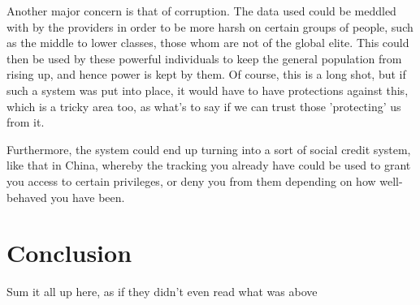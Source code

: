 \documentclass[12pt]{amsart}
\begin{document}
    Another major concern is that of corruption.
    The data used could be meddled with by the providers in order to be more harsh on certain groups of people, such as
    the middle to lower classes, those whom are not of the global elite.
    This could then be used by these powerful individuals to keep the general population from rising up, and hence power
    is kept by them.
    Of course, this is a long shot, but if such a system was put into place, it would have to have protections against
    this, which is a tricky area too, as what's to say if we can trust those 'protecting' us from it.

    Furthermore, the system could end up turning into a sort of social credit system, like that in China, whereby
    the tracking you already have could be used to grant you access to certain privileges, or deny you from them
    depending on how well-behaved you have been.


    \section{Conclusion}\label{sec:conclusion}

    Sum it all up here, as if they didn't even read what was above ~\cite{mr-book}

    {}
    
\end{document}
